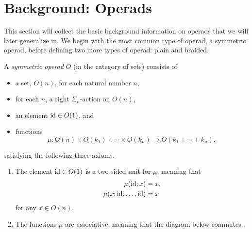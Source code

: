 
\section{Background: Operads}\label{sec:back-op}

This section will collect the basic background information on operads that we will later generalize in. We begin with the most common type of operad, a symmetric operad, before defining two more types of operad: plain and braided. 

\begin{Defi}\label{Defi:sym-op}
A \textit{symmetric operad} $O$ (in the category of sets) consists of
\begin{itemize}
\item a set, $O(n)$, for each natural number $n$,
\item for each $n$, a right $\Sigma_{n}$-action on $O(n)$,
\item an element $\textrm{id} \in O(1)$, and
\item functions
  \[
    \mu \colon  O(n) \times O(k_{1}) \times \cdots \times O(k_{n}) \rightarrow O(k_{1} + \cdots + k_{n}),
  \]
\end{itemize}
satisfying the following three axioms.
\begin{enumerate}
\item The element $\textrm{id} \in O(1)$ is a two-sided unit for $\mu$, meaning that
  \begin{align*}
    \mu(\textrm{id};x) &= x,\\
    \mu(x;\textrm{id},\ldots,\textrm{id}) &= x
  \end{align*}
for any $x \in O(n)$.
\item The functions $\mu$ are associative, meaning that the diagram below commutes.



\end{enumerate}
\end{Defi}

